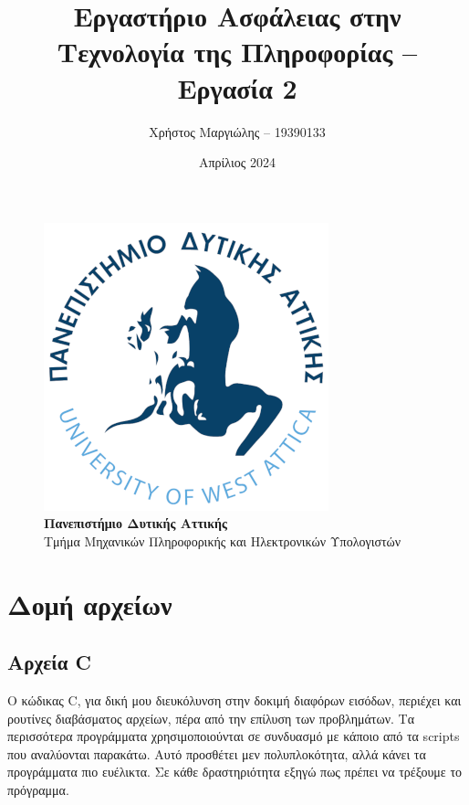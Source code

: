 \documentclass[12pt]{article}
\title{Εργαστήριο Ασφάλειας στην Τεχνολογία της Πληροφορίας -- Εργασία 2}
\author{Χρήστος Μαργιώλης -- 19390133}
\date{Απρίλιος 2024}
\begin{document}
\begin{titlepage}
        \maketitle
        \begin{figure}[t!]
        \begin{center}
        \includegraphics[scale=0.3]{./res/uniwalogo.png} \\
        \Large
        \textbf{Πανεπιστήμιο Δυτικής Αττικής} \\
        \large
        Τμήμα Μηχανικών Πληροφορικής και Ηλεκτρονικών Υπολογιστών
        \end{center}
        \end{figure}
\end{titlepage}

\renewcommand{\contentsname}{Περιεχόμενα}
\tableofcontents
\pagebreak

\section{Δομή αρχείων}

\subsection{Αρχεία C}

Ο κώδικας C, για δική μου διευκόλυνση στην δοκιμή διαφόρων εισόδων, περιέχει και
ρουτίνες διαβάσματος αρχείων, πέρα από την επίλυση των προβλημάτων. Τα περισσότερα
προγράμματα χρησιμοποιούνται σε συνδυασμό με κάποιο από τα scripts που αναλύονται
παρακάτω. Αυτό προσθέτει μεν πολυπλοκότητα, αλλά κάνει τα προγράμματα πιο ευέλικτα.
Σε κάθε δραστηριότητα εξηγώ πως πρέπει να τρέξουμε το πρόγραμμα.
\end{document}
